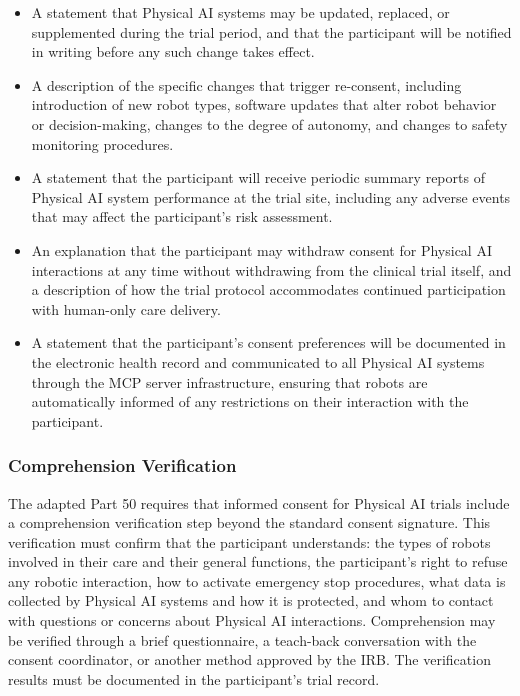 \begin{itemize}
    \item A statement that Physical AI systems may be updated, replaced, or
    supplemented during the trial period, and that the participant will be
    notified in writing before any such change takes effect.

    \item A description of the specific changes that trigger re-consent,
    including introduction of new robot types, software updates that alter
    robot behavior or decision-making, changes to the degree of autonomy,
    and changes to safety monitoring procedures.

    \item A statement that the participant will receive periodic summary
    reports of Physical AI system performance at the trial site, including
    any adverse events that may affect the participant's risk assessment.

    \item An explanation that the participant may withdraw consent for
    Physical AI interactions at any time without withdrawing from the
    clinical trial itself, and a description of how the trial protocol
    accommodates continued participation with human-only care delivery.

    \item A statement that the participant's consent preferences will be
    documented in the electronic health record and communicated to all
    Physical AI systems through the MCP server infrastructure, ensuring
    that robots are automatically informed of any restrictions on their
    interaction with the participant.
\end{itemize}

\subsubsection{Comprehension Verification}

The adapted Part 50 requires that informed consent for Physical AI trials
include a comprehension verification step beyond the standard consent
signature. This verification must confirm that the participant understands:
the types of robots involved in their care and their general functions, the
participant's right to refuse any robotic interaction, how to activate
emergency stop procedures, what data is collected by Physical AI systems and
how it is protected, and whom to contact with questions or concerns about
Physical AI interactions. Comprehension may be verified through a brief
questionnaire, a teach-back conversation with the consent coordinator, or
another method approved by the IRB. The verification results must be
documented in the participant's trial record.

